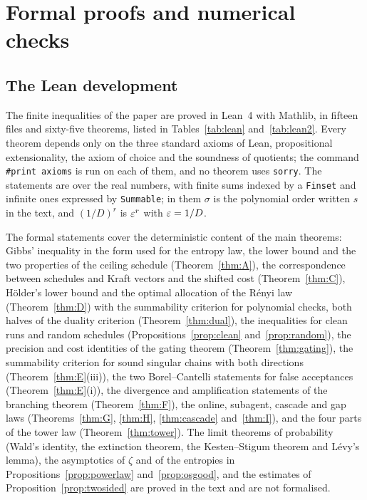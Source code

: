 \section{Formal proofs and numerical checks}\label{app:checks}

\subsection{The Lean development}

The finite inequalities of the paper are proved in Lean~4 with Mathlib, in fifteen files and sixty-five theorems, listed in Tables~\ref{tab:lean} and~\ref{tab:lean2}. Every theorem depends only on the three standard axioms of Lean, propositional extensionality, the axiom of choice and the soundness of quotients; the command \texttt{\#print axioms} is run on each of them, and no theorem uses \texttt{sorry}. The statements are over the real numbers, with finite sums indexed by a \texttt{Finset} and infinite ones expressed by \texttt{Summable}; in them $\sigma$ is the polynomial order written $s$ in the text, and $(1/D)^{r}$ is $\varepsilon^{r}$ with $\varepsilon=1/D$.

The formal statements cover the deterministic content of the main theorems: Gibbs' inequality in the form used for the entropy law, the lower bound and the two properties of the ceiling schedule (Theorem~\ref{thm:A}), the correspondence between schedules and Kraft vectors and the shifted cost (Theorem~\ref{thm:C}), H\"older's lower bound and the optimal allocation of the R\'enyi law (Theorem~\ref{thm:D}) with the summability criterion for polynomial checks, both halves of the duality criterion (Theorem~\ref{thm:dual}), the inequalities for clean runs and random schedules (Propositions~\ref{prop:clean} and~\ref{prop:random}), the precision and cost identities of the gating theorem (Theorem~\ref{thm:gating}), the summability criterion for sound singular chains with both directions (Theorem~\ref{thm:E}(iii)), the two Borel--Cantelli statements for false acceptances (Theorem~\ref{thm:E}(i)), the divergence and amplification statements of the branching theorem (Theorem~\ref{thm:F}), the online, subagent, cascade and gap laws (Theorems~\ref{thm:G}, \ref{thm:H}, \ref{thm:cascade} and~\ref{thm:I}), and the four parts of the tower law (Theorem~\ref{thm:tower}). The limit theorems of probability (Wald's identity, the extinction theorem, the Kesten--Stigum theorem and L\'evy's lemma), the asymptotics of $\zeta$ and of the entropies in Propositions~\ref{prop:powerlaw} and~\ref{prop:osgood}, and the estimates of Proposition~\ref{prop:twosided} are proved in the text and are not formalised.

